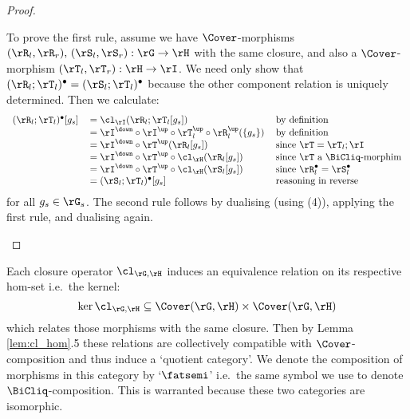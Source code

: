 \documentclass{article}
\begin{document}
\begin{proof}
\begin{enumerate}
To prove the first rule, assume we have $\Cover$-morphisms $(\rR_l,\rR_r),\,(\rS_l,\rS_r) : \rG \to \rH$ with the same closure, and also a $\Cover$-morphism $(\rT_l,\rT_r) : \rH \to \rI$. We need only show that $(\rR_l ; \rT_l)^\bullet = (\rS_l ; \rT_l)^\bullet$ because the other component relation is uniquely determined. Then we calculate:
\[
\begin{tabular}{lll}
$(\rR_l ; \rT_l)^\bullet [g_s]$
&
$= \cl_\rI(\rR_l ; \rT_l[g_s])$
& by definition
\\&
$= \rI^\down \circ \rI^\up \circ \rT_l^\up \circ \rR_l^\up(\{g_s\})$
& by definition
\\&
$= \rI^\down \circ \rT^\up (\rR_l[g_s])$
& since $\rT = \rT_l ; \rI$
\\&
$= \rI^\down \circ \rT^\up \circ \cl_\rH(\rR_l[g_s])$
& since $\rT$ a $\BiCliq$-morphim
\\&
$= \rI^\down \circ \rT^\up \circ \cl_\rH(\rS_l[g_s])$
& since $\rR_l^\bullet = \rS_l^\bullet$
\\&
$= (\rS_l ; \rT_l)^\bullet [g_s]$
& reasoning in reverse
\end{tabular}
\]
for all $g_s \in \rG_s$. The second rule follows by dualising (using (4)), applying the first rule, and dualising again.

\end{enumerate}
\end{proof}

Each closure operator $\cl_{\rG,\rH}$ induces an equivalence relation on its respective hom-set i.e.\ the kernel:
\[
\ker{\cl_{\rG,\rH}} \subseteq \Cover(\rG,\rH) \times \Cover(\rG,\rH)
\]
which relates those morphisms with the same closure. Then by Lemma \ref{lem:cl_hom}.5 these relations are collectively compatible with $\Cover$-composition and thus induce a `quotient category'. We denote the composition of morphisms in this category by `$\fatsemi$' i.e.\ the same symbol we use to denote $\BiCliq$-composition. This is warranted because these two categories are isomorphic.
\end{document}
